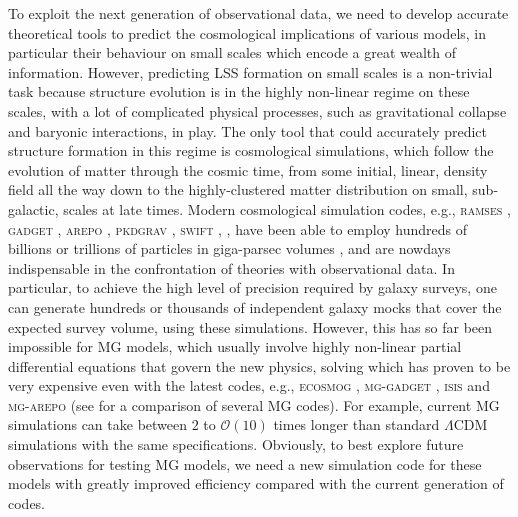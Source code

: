 To exploit the next generation of observational data, we need to develop accurate theoretical tools to predict the cosmological implications of various models, in particular their behaviour on small scales which encode a great wealth of information. However, predicting LSS formation on small scales is a non-trivial task because structure evolution is in the highly non-linear regime on these scales, with a lot of complicated physical processes, such as gravitational collapse and baryonic interactions, in play. The only tool that could accurately predict structure formation in this regime is cosmological simulations, which follow the evolution of matter through the cosmic time, from some initial, linear, density field all the way down to the highly-clustered matter distribution on small, sub-galactic, scales at late times. Modern cosmological simulation codes, e.g., \textsc{ramses} \cite{Teyssier:2001_RAMSES_code_paper}, \textsc{gadget} \cite{Springel:2005_Gadget_code_paper,Springel:2020plp}, \textsc{arepo} \cite{Springel:2010_AREPO_code_paper}, \textsc{pkdgrav} \cite{Potter:2016_PKDGRAV_code_paper}, \textsc{swift} \cite{Schaller:2016_SWIFT_code_paper}, , have been able to employ hundreds of billions or trillions of particles in giga-parsec volumes \cite[e.g.,][]{Angulo:2012_MXXL_sim_paper,Kim:2015_Horizon4_sim_paper,Potter:2016_PKDGRAV_code_paper}, and are nowdays indispensable in the confrontation of theories with observational data. In particular, to achieve the high level of precision required by galaxy surveys, one can generate hundreds or thousands of independent galaxy mocks that cover the expected survey volume, using these simulations. However, this has so far been impossible for \ac{MG} models, which usually involve highly non-linear partial differential equations that govern the new physics, solving which has proven to be very expensive even with the latest codes, e.g., \textsc{ecosmog} \cite{Li:2011_ECOSMOG_code_paper,Li:2013_ECOSMOGV_code_paper,2012JCAP...10..002B,Brax:2013mua}, \textsc{mg-gadget} \cite{Puchwein:2013_MGGADGET_code_paper}, \textsc{isis} \cite{Llinares:2013_ISIS_code_paper} and \textsc{mg-arepo} \cite{Arnold:2019_MGAREPO_code_paper,Hernandez-Aguayo:2020_MGAREPO_code_paper} (see \cite{Winther:2015_MG_code_comparison} for a comparison of several MG codes). For example, current \ac{MG} simulations can take between $2$ to $\mathcal{O}(10)$ times longer than standard $\Lambda$CDM simulations with the same specifications. Obviously, to best explore future observations for testing \ac{MG} models, we need a new simulation code for these models with greatly improved efficiency compared with the current generation of codes.

